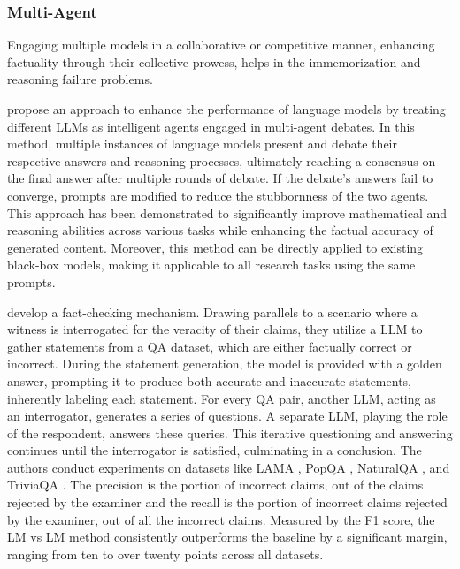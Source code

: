 
\subsubsection{Multi-Agent}
\label{sec:enhace_pure_multi}

Engaging multiple models in a collaborative or competitive manner, enhancing factuality through their collective prowess, helps in the immemorization and reasoning failure problems.

\citet{multiagent_debate} propose an approach to enhance the performance of language models by treating different LLMs as intelligent agents engaged in multi-agent debates. In this method, multiple instances of language models present and debate their respective answers and reasoning processes, ultimately reaching a consensus on the final answer after multiple rounds of debate. If the debate's answers fail to converge, prompts are modified to reduce the stubbornness of the two agents. This approach has been demonstrated to significantly improve mathematical and reasoning abilities across various tasks while enhancing the factual accuracy of generated content. Moreover, this method can be directly applied to existing black-box models, making it applicable to all research tasks using the same prompts.

\citet{cohen2023lm} develop a fact-checking mechanism. Drawing parallels to a scenario where a witness is interrogated for the veracity of their claims, they utilize a LLM to gather statements from a QA dataset, which are either factually correct or incorrect. During the statement generation, the model is provided with a golden answer, prompting it to produce both accurate and inaccurate statements, inherently labeling each statement. For every QA pair, another LLM, acting as an interrogator, generates a series of questions. A separate LLM, playing the role of the respondent, answers these queries. This iterative questioning and answering continues until the interrogator is satisfied, culminating in a conclusion. The authors conduct experiments on datasets like LAMA \citep{LAMA}, PopQA \citep{PopQA}, NaturalQA \citep{NQ}, and TriviaQA \citep{TQ}. The precision is the portion of incorrect claims, out of the claims rejected by the examiner and the recall is the portion of incorrect claims rejected by the examiner, out of all the incorrect claims. Measured by the F1 score, the LM vs LM method consistently outperforms the baseline by a significant margin, ranging from ten to over twenty points across all datasets.

